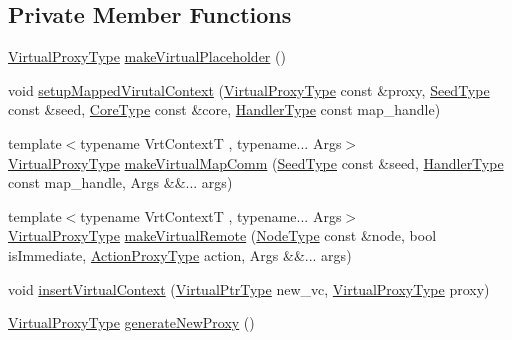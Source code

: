 \subsection*{Private Member Functions}
\begin{DoxyCompactItemize}
\item 
\hyperlink{namespacevt_a1b417dd5d684f045bb58a0ede70045ac}{Virtual\+Proxy\+Type} \hyperlink{structvt_1_1vrt_1_1_virtual_context_manager_ae3cb983e08d10e841b85782ada02967d}{make\+Virtual\+Placeholder} ()
\item 
void \hyperlink{structvt_1_1vrt_1_1_virtual_context_manager_aab5c2405987efcd1a5689c728f7bc7db}{setup\+Mapped\+Virutal\+Context} (\hyperlink{namespacevt_a1b417dd5d684f045bb58a0ede70045ac}{Virtual\+Proxy\+Type} const \&proxy, \hyperlink{namespacevt_ae2e13198bdef4d5b8e603d6c1c7f0969}{Seed\+Type} const \&seed, \hyperlink{namespacevt_a74b11b22c02feaabab8591acc87c7c52}{Core\+Type} const \&core, \hyperlink{namespacevt_af64846b57dfcaf104da3ef6967917573}{Handler\+Type} const map\+\_\+handle)
\item 
{\footnotesize template$<$typename Vrt\+ContextT , typename... Args$>$ }\\\hyperlink{namespacevt_a1b417dd5d684f045bb58a0ede70045ac}{Virtual\+Proxy\+Type} \hyperlink{structvt_1_1vrt_1_1_virtual_context_manager_af58e1757a222301b32b9964ea413cd00}{make\+Virtual\+Map\+Comm} (\hyperlink{namespacevt_ae2e13198bdef4d5b8e603d6c1c7f0969}{Seed\+Type} const \&seed, \hyperlink{namespacevt_af64846b57dfcaf104da3ef6967917573}{Handler\+Type} const map\+\_\+handle, Args \&\&... args)
\item 
{\footnotesize template$<$typename Vrt\+ContextT , typename... Args$>$ }\\\hyperlink{namespacevt_a1b417dd5d684f045bb58a0ede70045ac}{Virtual\+Proxy\+Type} \hyperlink{structvt_1_1vrt_1_1_virtual_context_manager_a7236496fc6ffb6f4b9631a5024008178}{make\+Virtual\+Remote} (\hyperlink{namespacevt_a866da9d0efc19c0a1ce79e9e492f47e2}{Node\+Type} const \&node, bool is\+Immediate, \hyperlink{namespacevt_a102aa105d64254d89f7e585d106c95aa}{Action\+Proxy\+Type} action, Args \&\&... args)
\item 
void \hyperlink{structvt_1_1vrt_1_1_virtual_context_manager_a398fd80620aad8ff9ba5fa9964a661a6}{insert\+Virtual\+Context} (\hyperlink{structvt_1_1vrt_1_1_virtual_context_manager_a24dd2acbbd37a53f4e4108d385a58441}{Virtual\+Ptr\+Type} new\+\_\+vc, \hyperlink{namespacevt_a1b417dd5d684f045bb58a0ede70045ac}{Virtual\+Proxy\+Type} proxy)
\item 
\hyperlink{namespacevt_a1b417dd5d684f045bb58a0ede70045ac}{Virtual\+Proxy\+Type} \hyperlink{structvt_1_1vrt_1_1_virtual_context_manager_a9afc60815d2b382215f458e0aae9dc3f}{generate\+New\+Proxy} ()

\end{DoxyCompactItemize}
